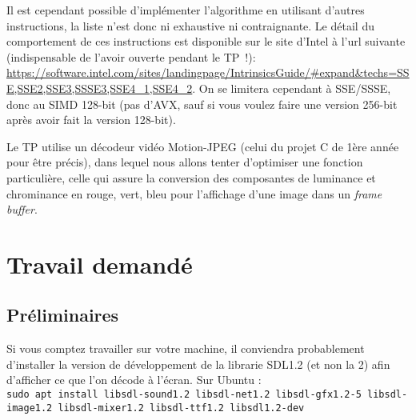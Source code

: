 \documentclass[a4paper,12pt]{article}
\begin{document}
\vspace{10pt}
Il est cependant possible d'implémenter l'algorithme en utilisant d'autres instructions, la liste n'est donc ni exhaustive ni contraignante. Le détail du comportement de ces instructions est disponible sur le site d'Intel à l'url suivante (indispensable de l'avoir ouverte pendant le TP~!):\\
{\footnotesize\ttfamily \url{https://software.intel.com/sites/landingpage/IntrinsicsGuide/#expand&techs=SSE,SSE2,SSE3,SSSE3,SSE4_1,SSE4_2}}. On se limitera cependant à SSE/SSSE, donc au SIMD 128-bit (pas d'AVX, sauf si vous voulez faire une version 256-bit après avoir fait la version 128-bit).

Le TP utilise un décodeur vidéo Motion-JPEG (celui du projet C de 1ère année pour être précis), dans lequel nous allons tenter d'optimiser une fonction particulière, celle qui assure la conversion des composantes de luminance et chrominance en rouge, vert, bleu pour l'affichage d'une image dans un \emph{frame buffer}.

\section{Travail demandé}

\subsection{Préliminaires}


Si vous comptez travailler sur votre machine, il conviendra probablement d'installer la version de développement de la librarie SDL1.2 (et non la 2) afin d'afficher ce que l'on décode à l'écran. Sur Ubuntu : \\

\lstinline{sudo apt install libsdl-sound1.2 libsdl-net1.2 libsdl-gfx1.2-5 libsdl-image1.2 libsdl-mixer1.2 libsdl-ttf1.2 libsdl1.2-dev} \\
\end{document}
